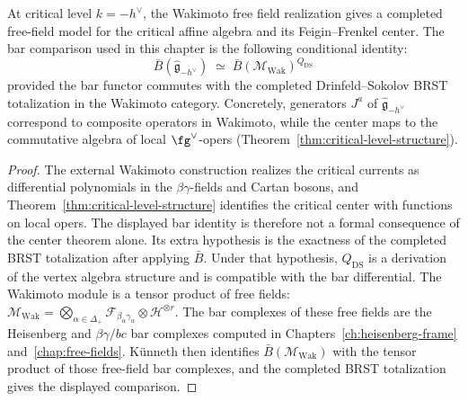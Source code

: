 \begin{theorem}\label{thm:wakimoto-koszul}
At critical level $k = -h^\vee$, the Wakimoto free field realization
gives a completed free-field model for the critical affine algebra and
its Feigin--Frenkel center. The bar comparison used in this chapter is
the following conditional identity:
\begin{equation}
\bar{B}(\widehat{\mathfrak{g}}_{-h^\vee}) \;\simeq\; \bar{B}(\mathcal{M}_{\mathrm{Wak}})^{Q_{\mathrm{DS}}}
\end{equation}
provided the bar functor commutes with the completed
Drinfeld--Sokolov BRST totalization in the Wakimoto category.
Concretely, generators $J^a$ of $\widehat{\mathfrak{g}}_{-h^\vee}$
correspond to composite operators in Wakimoto, while the center maps to
the commutative algebra of local $\fg^\vee$-opers
(Theorem~\ref{thm:critical-level-structure}).
\end{theorem}

\begin{proof}
The external Wakimoto construction
\cite{Wakimoto86,FeiginFrenkel90bosonization} realizes the critical
currents as differential polynomials in the
$\beta\gamma$-fields and Cartan bosons, and
Theorem~\ref{thm:critical-level-structure} identifies the critical
center with functions on local opers. The displayed bar identity is
therefore not a formal consequence of the center theorem alone. Its
extra hypothesis is the exactness of the completed BRST totalization
after applying $\bar B$. Under that hypothesis,
$Q_{\mathrm{DS}}$ is a derivation of the vertex algebra structure and
is compatible with the bar differential. The Wakimoto module is a
tensor product of free fields:
$\mathcal{M}_{\mathrm{Wak}} =
\bigotimes_{\alpha \in \Delta_+}\mathcal{F}_{\beta_\alpha\gamma_\alpha}
\otimes \mathcal{H}^{\otimes r}$. The bar complexes of these free
fields are the Heisenberg and $\beta\gamma/bc$ bar complexes computed
in Chapters~\ref{ch:heisenberg-frame} and~\ref{chap:free-fields}.
K\"unneth then identifies $\bar B(\mathcal M_{\mathrm{Wak}})$ with the
tensor product of those free-field bar complexes, and the completed
BRST totalization gives the displayed comparison.
\end{proof}

